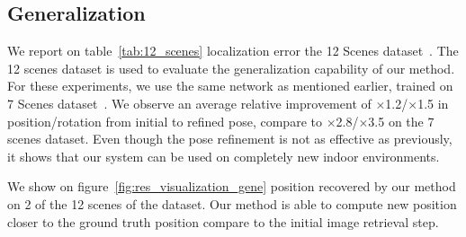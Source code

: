 

\subsection{Generalization}
We report on table~\ref{tab:12_scenes} localization error the 12 Scenes dataset~\citep{Valentin2016}. The 12 scenes dataset is used to evaluate the generalization capability of our method.  For these experiments, we use the same network as mentioned earlier, trained on 7 Scenes dataset~\citep{Shotton2013}. We observe an average relative improvement of $\times$1.2/$\times$1.5 in position/rotation from initial to refined pose, compare to $\times$2.8/$\times$3.5 on the 7 scenes dataset. Even though the pose refinement is not as effective as previously, it shows that our system can be used on completely new indoor environments. 

We show on figure~\ref{fig:res_visualization_gene} position recovered by our method on 2 of the 12 scenes of the dataset. Our method is able to compute new position closer to the ground truth position compare to the initial image retrieval step.

